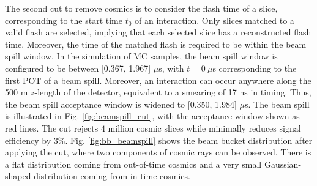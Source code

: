 The second cut to remove cosmics is to consider the flash time of a slice, corresponding to the start time $t_0$ of an interaction. 
Only slices matched to a valid flash are selected, implying that each selected slice has a reconstructed flash time.
Moreover, the time of the matched flash is required to be within the beam spill window.
In the simulation of MC samples, the beam spill window is configured to be between [0.367, 1.967] $\mu$s, with $t = 0\ \mu$s corresponding to the first POT of a beam spill.
Moreover, an interaction can occur anywhere along the 500 m $z$-length of the detector, equivalent to a smearing of 17 ns in timing.
Thus, the beam spill acceptance window is widened to [0.350, 1.984] $\mu$s.
The beam spill is illustrated in Fig. \ref{fig:beamspill_cut}, with the acceptance window shown as red lines.
The cut rejects $4$ million cosmic slices while minimally reduces signal efficiency by $3\%$.
Fig. \ref{fig:bb_beamspill} shows the beam bucket distribution after applying the cut, where two components of cosmic rays can be observed.
There is a flat distribution coming from out-of-time cosmics and a very small Gaussian-shaped distribution coming from in-time cosmics.


